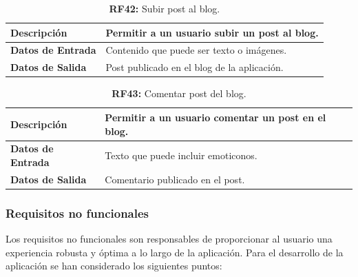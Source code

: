 \documentclass[a4paper, 12pt]{article}
\begin{document}
\begin{table}[H]
\captionsetup{justification=raggedright,singlelinecheck=false}
\caption{\textbf{RF42:} Subir post al blog.}
\label{tab:RF42}
	\begin{tabular}{|m{5cm}|m{10cm}|}
	\hline
	\textbf{Descripción} & Permitir a un usuario subir un post al blog. \\ 
	\hline
	\textbf{Datos de Entrada} & Contenido que puede ser texto o imágenes. \\ 
	\hline
	\textbf{Datos de Salida} & Post publicado en el blog de la aplicación. \\ 
	\hline
\end{tabular}
\end{table}

\begin{table}[H]
\captionsetup{justification=raggedright,singlelinecheck=false}
\caption{\textbf{RF43:} Comentar post del blog.}
\label{tab:RF43}
	\begin{tabular}{|m{5cm}|m{10cm}|}
	\hline
	\textbf{Descripción} & Permitir a un usuario comentar un post en el blog. \\ 
	\hline
	\textbf{Datos de Entrada} & Texto que puede incluir emoticonos. \\ 
	\hline
	\textbf{Datos de Salida} & Comentario publicado en el post. \\ 
	\hline
\end{tabular}
\end{table}


\subsubsection{Requisitos no funcionales}

Los requisitos no funcionales son responsables de proporcionar al usuario una experiencia robusta y óptima a lo largo de la aplicación. Para el desarrollo de la aplicación se han considerado los siguientes puntos:
\end{document}
